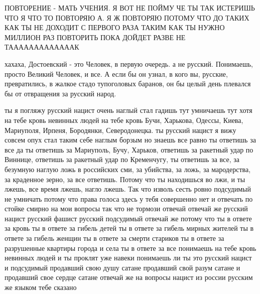 ПОВТОРЕНИЕ - МАТЬ УЧЕНИЯ. Я ВОТ НЕ ПОЙМУ ЧЕ ТЫ ТАК ИСТЕРИШЬ ЧТО Я ЧТО ТО
ПОВТОРЯЮ А. Я Ж ПОВТОРЯЮ ПОТОМУ ЧТО ДО ТАКИХ КАК ТЫ НЕ ДОХОДИТ С ПЕРВОГО РАЗА
ТАКИМ КАК ТЫ НУЖНО МИЛЛИОН РАЗ ПОВТОРИТЬ ПОКА ДОЙДЕТ РАЗВЕ НЕ ТАААААААААААААК

хахаха, Достоевский - это Человек, в первую очередь. а не русский. Понимаешь,
просто Великий Человек, и все. А если бы он узнал, в кого вы, русские,
превратились, в жалкое стадо тупоголовых баранов, он бы целый день плевался бы
от отвращения за русский народ.


ты я погляжу русский нацист очень наглый стал гадишь тут умничаешь тут хотя на
тебе кровь невинных людей на тебе кровь Бучи, Харькова, Одессы, Киева,
Мариуполя, Ирпеня, Бородянки, Северодонецка. ты русский нацист я вижу совсем
опух стал таким себе наглым борзым но знаешь все равно ты ответишь за все да ты
ответишь за Мариуполь, Бучу, Харьков, ответишь за ракетный удар по Виннице,
ответишь за ракетный удар по Кременчугу, ты ответишь за все, за безумную наглую
ложь в российских сми, за убийства, за ложь, за мародерства, за краденное
зерно, за все ответишь. Потому что ты находишься во лжи, и ты лжешь, все время
лжешь, нагло лжешь. Так что изволь сесть ровно подсудимый не умничать потому
что права голоса здесь у тебя совершенно нет и отвечать по стойке смирно на мои
вопросы так что не тормози отвечай отвечай же русский нацист русский фашист
русский подсудимый отвечай же потому что ты в ответе за кровь ты в ответе за
гибель детей ты в ответе за гибель мирных жителей ты в ответе за гибель женщин
ты в ответе за смерти стариков ты в ответе за разрушенные квартиры города и
села ты в ответе за все понимаешь на тебе кровь невинных людей и ты проклят уже
навеки понимаешь ли ты это русский нацист и подсудимый продавший свою душу
сатане продавший свой разум сатане и продавший свое сердце сатане отвечай же на
вопросы нацист из россии русским же языком тебе сказано

